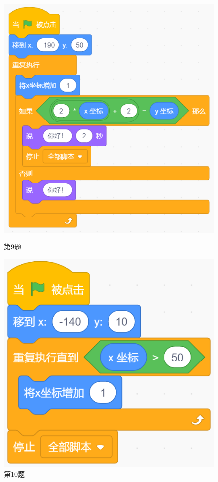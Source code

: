 \documentclass[10pt, a4paper]{article}
\begin{document}
\begin{enumerate}
\begin{figure}[htbp]
\begin{minipage}[t]{.215\textwidth}
                \includegraphics[width=\textwidth]{9.png}
                \caption*{第9题}
            \end{minipage}
            \begin{minipage}[t]{.2\textwidth}
                \centering
                \includegraphics[width=\textwidth]{10.png}
                \caption*{第10题}
            \end{minipage}
        \end{figure}


\end{enumerate}
\end{document}

